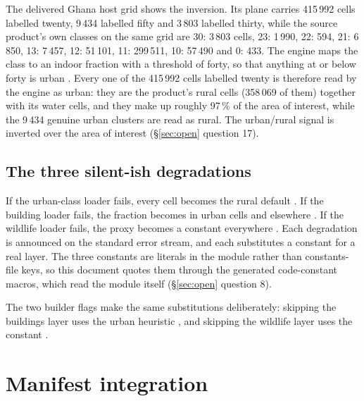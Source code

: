 \documentclass[11pt,a4paper]{article} \usepackage[utf8]{inputenc} \usepackage{lmodern} \usepackage[T1]{fontenc}
\begin{document}
The delivered Ghana host grid shows the inversion. Its  plane carries
415\,992 cells labelled twenty, 9\,434 labelled fifty and 3\,803 labelled thirty, while the
source product's own classes on the same grid are 30: 3\,803 cells, 23: 1\,990, 22: 594,
21: 6\,850, 13: 7\,457, 12: 51\,101, 11: 299\,511, 10: 57\,490 and 0: 433. The engine maps
the class to an indoor fraction with a threshold of forty, so that anything at or below forty
is urban . Every one of the
415\,992 cells labelled twenty is therefore read by the engine as urban: they are the product's
rural cells (358\,069 of them) together with its water cells, and they make up roughly
97\,\% of the area of interest, while the 9\,434 genuine urban clusters are read as rural. The
urban/rural signal is inverted over the area of interest (\S\ref{sec:open} question 17).

\subsection{The three silent-ish degradations}

If the urban-class loader fails, every cell becomes the rural default
. If the building loader fails, the
fraction becomes  in urban cells and
 elsewhere
. If the wildlife loader fails, the proxy
becomes a constant  everywhere
. Each
degradation is announced on the standard error stream, and each substitutes a constant for a
real layer. The three constants are literals in the module rather than constants-file keys, so
this document quotes them through the generated code-constant macros, which read the module
itself (\S\ref{sec:open} question 8).

The two builder flags make the same substitutions deliberately: skipping the buildings layer
uses the urban heuristic , and skipping the
wildlife layer uses the constant .

\section{Manifest integration} \label{sec:manifest}
\end{document}
